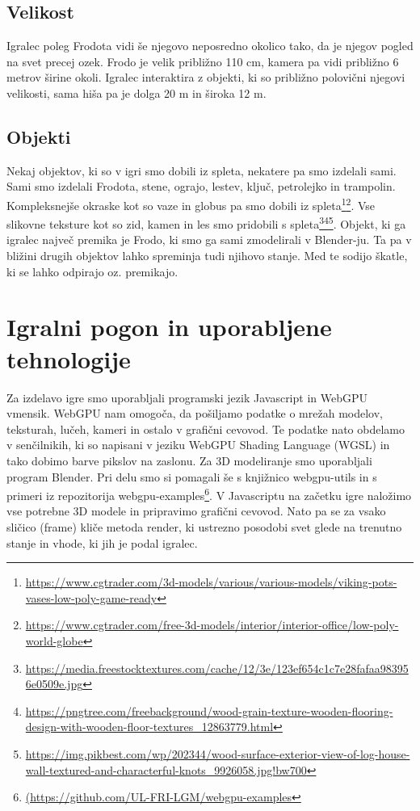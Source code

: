 \documentclass[a4paper,12pt]{article}
\begin{document}
\begin{figure}[h!]
    \centering
\end{figure}

\subsection{Velikost}
\noindent Igralec poleg Frodota vidi še njegovo neposredno okolico tako, da je njegov pogled na svet precej ozek. Frodo je velik približno 110 cm, kamera pa vidi približno 6 metrov širine okoli. Igralec interaktira z objekti, ki so približno polovični njegovi velikosti, sama hiša pa je dolga 20 m in široka 12 m.

\subsection{Objekti}
\noindent Nekaj objektov, ki so v igri smo dobili iz spleta, nekatere pa smo izdelali sami. Sami smo izdelali Frodota, stene, ograjo, lestev, ključ, petrolejko in trampolin. Kompleksnejše okraske kot so vaze in globus pa smo dobili iz spleta\footnote{\url{https://www.cgtrader.com/3d-models/various/various-models/viking-pots-vases-low-poly-game-ready}}\footnote{\url{https://www.cgtrader.com/free-3d-models/interior/interior-office/low-poly-world-globe}}. Vse slikovne teksture kot so zid, kamen in les smo pridobili s spleta\footnote{\url{https://media.freestocktextures.com/cache/12/3e/123ef654c1c7e28fafaa983956e0509e.jpg}}\footnote{\url{https://pngtree.com/freebackground/wood-grain-texture-wooden-flooring-design-with-wooden-floor-textures_12863779.html}}\footnote{\url{https://img.pikbest.com/wp/202344/wood-surface-exterior-view-of-log-house-wall-textured-and-characterful-knots_9926058.jpg!bw700}}. Objekt, ki ga igralec največ premika je Frodo, ki smo ga sami zmodelirali v Blender-ju. Ta pa v bližini drugih objektov lahko spreminja tudi njihovo stanje. Med te sodijo škatle, ki se lahko odpirajo oz. premikajo.


\section{Igralni pogon in uporabljene tehnologije}
\noindent Za izdelavo igre smo uporabljali programski jezik Javascript in WebGPU vmensik. WebGPU nam omogoča, da pošiljamo podatke o mrežah modelov, teksturah, lučeh, kameri in ostalo v grafični cevovod. Te podatke nato obdelamo v senčilnikih, ki so napisani v jeziku WebGPU Shading Language (WGSL) in tako dobimo barve pikslov na zaslonu. Za 3D modeliranje smo uporabljali program Blender. Pri delu smo si pomagali še s knjižnico webgpu-utils in s primeri iz repozitorija webgpu-examples\footnote{\url{(https://github.com/UL-FRI-LGM/webgpu-examples}}.
V Javascriptu na začetku igre naložimo vse potrebne 3D modele in pripravimo grafični cevovod. Nato pa se za vsako sličico (frame) kliče metoda render, ki ustrezno posodobi svet glede na trenutno stanje in vhode, ki jih je podal igralec.
\end{document}

